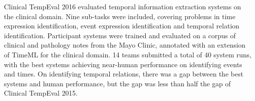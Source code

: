 Clinical TempEval 2016 evaluated temporal information extraction systems on the clinical domain. Nine sub-tasks were included, covering problems in time expression identification, event expression identification and temporal relation identification. Participant systems were trained and evaluated on a corpus of clinical and pathology notes from the Mayo Clinic, annotated with an extension of TimeML for the clinical domain. 14 teams submitted a total of 40 system runs, with the best systems achieving near-human performance on identifying events and times. On identifying temporal relations, there was a gap between the best systems and human performance, but the gap was less than half the gap of Clinical TempEval 2015.
